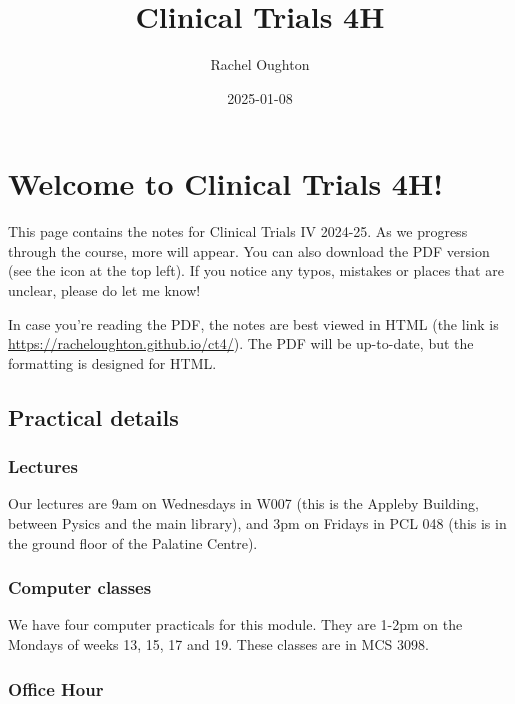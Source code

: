 \documentclass[
  openany]{book}
\title{Clinical Trials 4H}
\author{Rachel Oughton}
\date{2025-01-08}
\theoremstyle{definition}
\theoremstyle{definition}
\theoremstyle{definition}
\theoremstyle{definition}
\theoremstyle{remark}
\begin{document}
\maketitle

{
\setcounter{tocdepth}{1}
\tableofcontents
}
\chapter*{Welcome to Clinical Trials 4H!}\label{welcome-to-clinical-trials-4h}

This page contains the notes for Clinical Trials IV 2024-25. As we progress through the course, more will appear. You can also download the PDF version (see the icon at the top left). If you notice any typos, mistakes or places that are unclear, please do let me know!

In case you're reading the PDF, the notes are best viewed in HTML (the link is \url{https://racheloughton.github.io/ct4/}). The PDF will be up-to-date, but the formatting is designed for HTML.

\section*{Practical details}\label{practical-details}

\subsection*{Lectures}\label{lectures}

Our lectures are 9am on Wednesdays in W007 (this is the Appleby Building, between Pysics and the main library), and 3pm on Fridays in PCL 048 (this is in the ground floor of the Palatine Centre).

\subsection*{Computer classes}\label{computer-classes}

We have four computer practicals for this module. They are 1-2pm on the Mondays of weeks 13, 15, 17 and 19. These classes are in MCS 3098.

\subsection*{Office Hour}\label{office-hour}
\end{document}
